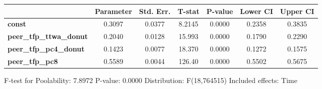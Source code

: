 \begin{center}
\begin{tabular}{lclc}
\bottomrule
\end{tabular}
\begin{tabular}{lcccccc}
                                & \textbf{Parameter} & \textbf{Std. Err.} & \textbf{T-stat} & \textbf{P-value} & \textbf{Lower CI} & \textbf{Upper CI}  \\
\midrule
\textbf{const}                  &       0.3097       &       0.0377       &      8.2145     &      0.0000      &       0.2358      &       0.3835       \\
\textbf{peer\_tfp\_ttwa\_donut} &       0.2040       &       0.0128       &      15.993     &      0.0000      &       0.1790      &       0.2290       \\
\textbf{peer\_tfp\_pc4\_donut}  &       0.1423       &       0.0077       &      18.370     &      0.0000      &       0.1272      &       0.1575       \\
\textbf{peer\_tfp\_pc8}         &       0.5589       &       0.0044       &      126.40     &      0.0000      &       0.5502      &       0.5675       \\
\bottomrule
\end{tabular}
\end{center}

F-test for Poolability: 7.8972 \newline
 P-value: 0.0000 \newline
 Distribution: F(18,764515) \newline
  \newline
 Included effects: Time

